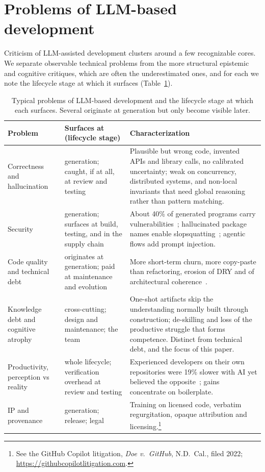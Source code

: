 \documentclass[sigconf]{acmart}
\begin{document}
\section{Problems of LLM-based development}
Criticism of LLM-assisted development clusters around a few recognizable cores. We separate observable technical problems from the more structural epistemic and cognitive critiques, which are often the underestimated ones, and for each we note the lifecycle stage at which it surfaces (Table~\ref{tab:problems}).

\begin{table}[t]
\caption{Typical problems of LLM-based development and the lifecycle stage at which each surfaces. Several originate at generation but only become visible later.}
\label{tab:problems}
\small
\begin{tabularx}{\textwidth}{@{}p{2.9cm}p{3.1cm}X@{}}
\toprule
Problem & Surfaces at (lifecycle stage) & Characterization \\
\midrule
Correctness and hallucination & generation; caught, if at all, at review and testing & Plausible but wrong code, invented APIs and library calls, no calibrated uncertainty; weak on concurrency, distributed systems, and non-local invariants that need global reasoning rather than pattern matching. \\
Security & generation; surfaces at build, testing, and in the supply chain & About 40\% of generated programs carry vulnerabilities~\cite{pearce2022asleep}; hallucinated package names enable slopsquatting~\cite{spracklen2025packages}; agentic flows add prompt injection. \\
Code quality and technical debt & originates at generation; paid at maintenance and evolution & More short-term churn, more copy-paste than refactoring, erosion of DRY and of architectural coherence~\cite{gitclear2024churn}. \\
Knowledge debt and cognitive atrophy & cross-cutting; design and maintenance; the team & One-shot artifacts skip the understanding normally built through construction; de-skilling and loss of the productive struggle that forms competence. Distinct from technical debt, and the focus of this paper. \\
Productivity, perception vs reality & whole lifecycle; verification overhead at review and testing & Experienced developers on their own repositories were 19\% slower with AI yet believed the opposite~\cite{metr2025productivity}; gains concentrate on boilerplate. \\
IP and provenance & generation; release; legal & Training on licensed code, verbatim regurgitation, opaque attribution and licensing.\footnote{See the {GitHub Copilot} litigation, \emph{Doe v.\ GitHub}, N.D.\ Cal., filed 2022; \url{https://githubcopilotlitigation.com}.} \\

\end{tabularx}
\end{table}
\end{document}
